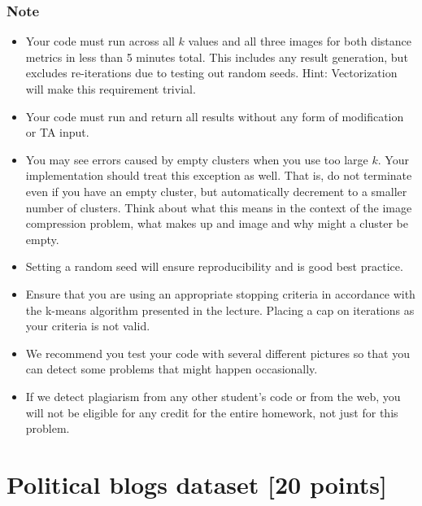 \documentclass[twoside,10pt]{article}
\begin{document}
\subsubsection*{Note}
\begin{itemize}

  \item Your code must run across all $k$ values and all three images for both distance metrics in less than 5 minutes total. This includes any result generation, but excludes re-iterations due to testing out random seeds. Hint: Vectorization will make this requirement trivial.
  \item Your code must run and return all results without any form of modification or TA input.
  \item You may see errors caused by empty clusters when you use too large $k$. Your implementation should treat this exception as well. That is, do not terminate even if you have an empty cluster, but automatically decrement to a smaller number of clusters. Think about what this means in the context of the image compression problem, what makes up and image and why might a cluster be empty.

  \item Setting a random seed will ensure reproducibility and is good best practice.
  \item Ensure that you are using an appropriate stopping criteria in accordance with the k-means algorithm presented in the lecture. Placing a cap on iterations as your criteria is not valid.

  \item We recommend you test your code with several different pictures so that you can detect some problems that might happen occasionally. 

  \item If we detect plagiarism from any other student's code or from the web, you will not be eligible for any credit for the entire homework, not just for this problem.
\end{itemize}




\section{Political blogs dataset [20 points]}
\end{document}
